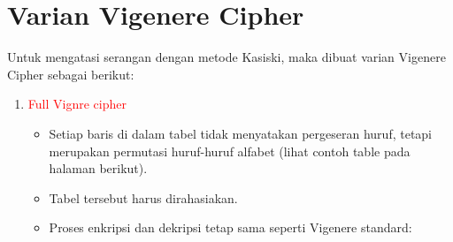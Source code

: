 \documentclass{article}
\begin{document}

\section*{Varian Vigenere Cipher}

Untuk mengatasi serangan dengan metode Kasiski, maka dibuat varian Vigenere Cipher sebagai berikut:

\begin{enumerate}
    \item \textcolor{red}{Full Vignre cipher}
    \begin{itemize}
        \item Setiap baris di dalam tabel tidak menyatakan pergeseran huruf, tetapi merupakan permutasi huruf-huruf alfabet (lihat contoh table pada halaman berikut).
        \item Tabel tersebut harus dirahasiakan.
        \item Proses enkripsi dan dekripsi tetap sama seperti Vigenere standard:
    \end{itemize}
\end{enumerate}
\end{document}

